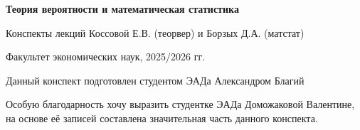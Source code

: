 

\begin{center}
    \textbf{\Huge{Теория вероятности и математическая статистика}}
    \vspace{5cm}

    Конспекты лекций Коссовой Е.В. (теорвер) и Борзых Д.А. (матстат)

    Факультет экономических наук, 2025/2026 гг.

    \vspace{5cm}
    Данный конспект подготовлен студентом ЭАДа Александром Благий
    
    Особую благодарность хочу выразить студентке ЭАДа Доможаковой Валентине, на основе её записей составлена значительная часть данного конспекта.


\end{center}
\setcounter{maindf}{1}
\setcounter{subdf}{0}

\setcounter{mainth}{1}
\setcounter{subth}{0}

\setcounter{mainpr}{1}
\setcounter{subpr}{0}

